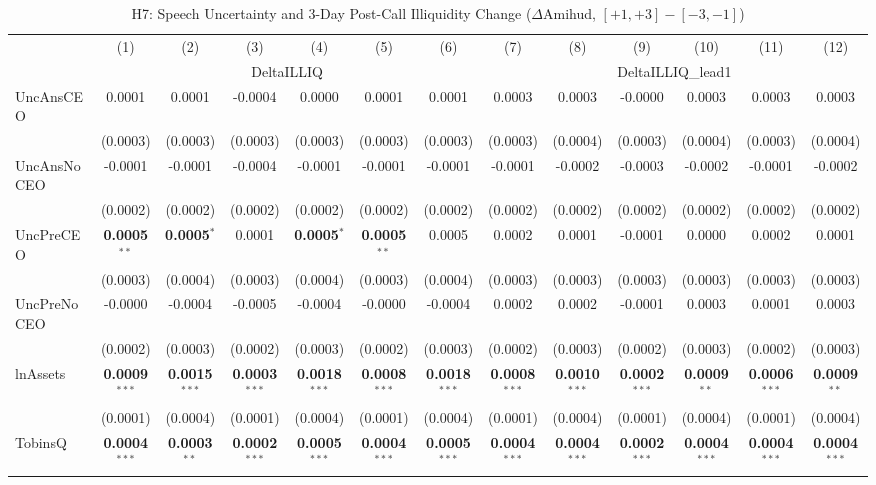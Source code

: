 \documentclass[11pt,a4paper]{article}
\begin{document}
\clearpage
\begin{table}[htbp]
\centering
\caption{H7: Speech Uncertainty and 3-Day Post-Call Illiquidity Change ($\Delta$Amihud, $[+1,+3]-[-3,-1]$)}
\label{tab:h7_robust}
\scriptsize
\begin{tabular}{lcccccccccccc}
\toprule
 & (1) & (2) & (3) & (4) & (5) & (6) & (7) & (8) & (9) & (10) & (11) & (12) \\
 & \multicolumn{6}{c}{DeltaILLIQ} & \multicolumn{6}{c}{DeltaILLIQ\_lead1} \\
\cmidrule(lr){2-7} \cmidrule(lr){8-13}
\midrule
UncAnsCEO & 0.0001 & 0.0001 & -0.0004 & 0.0000 & 0.0001 & 0.0001 & 0.0003 & 0.0003 & -0.0000 & 0.0003 & 0.0003 & 0.0003 \\
 & (0.0003) & (0.0003) & (0.0003) & (0.0003) & (0.0003) & (0.0003) & (0.0003) & (0.0004) & (0.0003) & (0.0004) & (0.0003) & (0.0004) \\
UncAnsNoCEO & -0.0001 & -0.0001 & -0.0004 & -0.0001 & -0.0001 & -0.0001 & -0.0001 & -0.0002 & -0.0003 & -0.0002 & -0.0001 & -0.0002 \\
 & (0.0002) & (0.0002) & (0.0002) & (0.0002) & (0.0002) & (0.0002) & (0.0002) & (0.0002) & (0.0002) & (0.0002) & (0.0002) & (0.0002) \\
UncPreCEO & \textbf{0.0005}$^{**}$ & \textbf{0.0005}$^{*}$ & 0.0001 & \textbf{0.0005}$^{*}$ & \textbf{0.0005}$^{**}$ & 0.0005 & 0.0002 & 0.0001 & -0.0001 & 0.0000 & 0.0002 & 0.0001 \\
 & (0.0003) & (0.0004) & (0.0003) & (0.0004) & (0.0003) & (0.0004) & (0.0003) & (0.0003) & (0.0003) & (0.0003) & (0.0003) & (0.0003) \\
UncPreNoCEO & -0.0000 & -0.0004 & -0.0005 & -0.0004 & -0.0000 & -0.0004 & 0.0002 & 0.0002 & -0.0001 & 0.0003 & 0.0001 & 0.0003 \\
 & (0.0002) & (0.0003) & (0.0002) & (0.0003) & (0.0002) & (0.0003) & (0.0002) & (0.0003) & (0.0002) & (0.0003) & (0.0002) & (0.0003) \\
\midrule
lnAssets & \textbf{0.0009}$^{***}$ & \textbf{0.0015}$^{***}$ & \textbf{0.0003}$^{***}$ & \textbf{0.0018}$^{***}$ & \textbf{0.0008}$^{***}$ & \textbf{0.0018}$^{***}$ & \textbf{0.0008}$^{***}$ & \textbf{0.0010}$^{***}$ & \textbf{0.0002}$^{***}$ & \textbf{0.0009}$^{**}$ & \textbf{0.0006}$^{***}$ & \textbf{0.0009}$^{**}$ \\
 & (0.0001) & (0.0004) & (0.0001) & (0.0004) & (0.0001) & (0.0004) & (0.0001) & (0.0004) & (0.0001) & (0.0004) & (0.0001) & (0.0004) \\
TobinsQ & \textbf{0.0004}$^{***}$ & \textbf{0.0003}$^{**}$ & \textbf{0.0002}$^{***}$ & \textbf{0.0005}$^{***}$ & \textbf{0.0004}$^{***}$ & \textbf{0.0005}$^{***}$ & \textbf{0.0004}$^{***}$ & \textbf{0.0004}$^{***}$ & \textbf{0.0002}$^{***}$ & \textbf{0.0004}$^{***}$ & \textbf{0.0004}$^{***}$ & \textbf{0.0004}$^{***}$ \\

\end{tabular}
\end{table}
\end{document}
